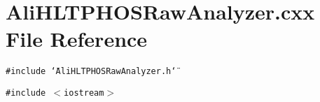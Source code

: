 \section{Ali\-HLTPHOSRaw\-Analyzer.cxx File Reference}
\label{AliHLTPHOSRawAnalyzer_8cxx}
{\tt \#include \char`\"{}Ali\-HLTPHOSRaw\-Analyzer.h\char`\"{}}\par
{\tt \#include $<$iostream$>$}\par
